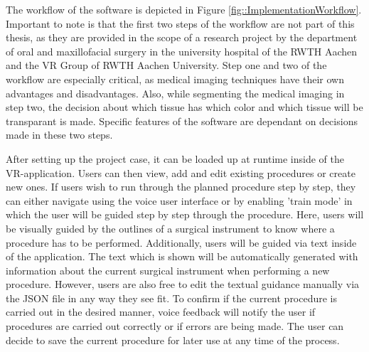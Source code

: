 The workflow of the software is depicted in Figure \ref{fig::ImplementationWorkflow}.
Important to note is that the first two steps of the workflow are not part of this thesis, as they are provided in the scope of a research project by the department of oral and maxillofacial surgery in the university hospital of the RWTH Aachen and the VR Group of RWTH Aachen University.
Step one and two of the workflow are especially critical, as medical imaging techniques have their own advantages and disadvantages.
Also, while segmenting the medical imaging in step two, the decision about which tissue has which color and which tissue will be transparant is made.
Specific features of the software are dependant on decisions made in these two steps.



After setting up the project case, it can be loaded up at runtime inside of the VR-application.
Users can then view, add and edit existing procedures or create new ones.
If users wish to run through the planned procedure step by step, they can either navigate using the voice user interface or by enabling 'train mode' in which the user will be guided step by step through the procedure.
Here, users will be visually guided by the outlines of a surgical instrument to know where a procedure has to be performed.
Additionally, users will be guided via text inside of the application.
The text which is shown will be automatically generated with information about the current surgical instrument when performing a new procedure.
However, users are also free to edit the textual guidance manually via the JSON file in any way they see fit.
To confirm if the current procedure is carried out in the desired manner, voice feedback will notify the user if procedures are carried out correctly or if errors are being made.
The user can decide to save the current procedure for later use at any time of the process.